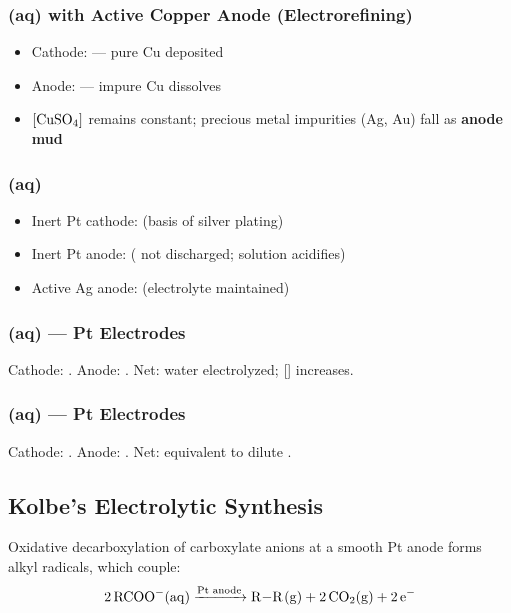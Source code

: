 \subsubsection{(aq) with Active Copper Anode (Electrorefining)}
\begin{itemize}
    \item Cathode:  --- pure Cu deposited
    \item Anode:  --- impure Cu dissolves
    \item $[\ce{CuSO4}]$ remains constant; precious metal impurities (Ag, Au) fall as \textbf{anode mud}
\end{itemize}

\subsubsection{(aq)}
\begin{itemize}
    \item Inert Pt cathode:  (basis of silver plating)
    \item Inert Pt anode:  ( not discharged; solution acidifies)
    \item Active Ag anode:  (electrolyte maintained)
\end{itemize}

\subsubsection{(aq) --- Pt Electrodes}
Cathode: . Anode: . Net: water electrolyzed; [] increases.

\subsubsection{(aq) --- Pt Electrodes}
Cathode: . Anode: . Net: equivalent to dilute .

\subsection{Kolbe's Electrolytic Synthesis}

Oxidative decarboxylation of carboxylate anions at a smooth Pt anode forms alkyl radicals, which couple:
\begin{equation}
    \ce{2RCOO^-(aq) ->[\text{Pt anode}] R-R(g) + 2CO2(g) + 2e-}
\end{equation}

